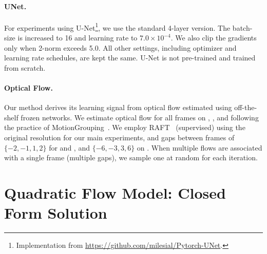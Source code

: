 \paragraph{UNet.} For experiments using U-Net\footnote{Implementation from \url{https://github.com/milesial/Pytorch-UNet}.}, we use the standard 4-layer version. The batch-size is increased to 16 and learning rate to $7.0\times10^{-4}$. We also clip the gradients only when 2-norm exceeds 5.0. All other settings, including optimizer and learning rate schedules, are kept the same. U-Net is not pre-trained and trained from scratch.  

\paragraph{Optical Flow.}
Our method derives its learning signal from optical flow estimated using off-the-shelf frozen networks.
We estimate optical flow for all frames on \DAVIS, \ST, and \FBMS following the practice of MotionGrouping~\cite{yang2021self-supervised}.
We employ RAFT~\cite{teed2020raft} (supervised) using the original resolution for our main experiments, and gaps between frames of $\{-2, -1, 1, 2\}$ for \DAVIS and \ST, and $\{-6, -3, 3, 6\}$ on \FBMS{}\@. When multiple flows are associated with a single frame (multiple gaps), we sample one at random for each iteration.


\section{Quadratic Flow Model: Closed Form Solution} \label{sup:sec2}

\newcommand{\USigma}{\Lambda}

